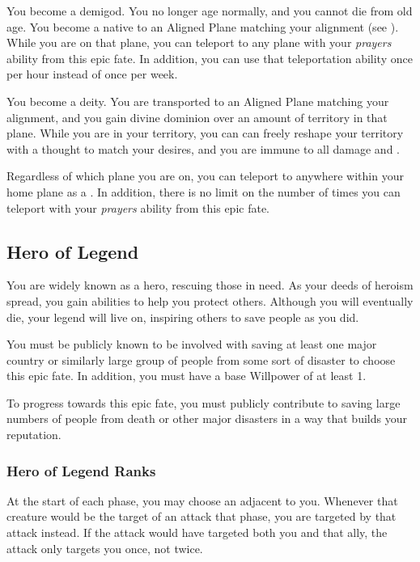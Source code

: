              You become a demigod.
            You no longer age normally, and you cannot die from old age.
            You become a  native to an Aligned Plane matching your alignment (see ).
            While you are on that plane, you can teleport to any plane with your \textit{prayers} ability from this epic fate.
            In addition, you can use that teleportation ability once per hour instead of once per week.

             You become a deity.
            You are transported to an Aligned Plane matching your alignment, and you gain divine dominion over an amount of territory in that plane.
            While you are in your territory, you can can freely reshape your territory with a thought to match your desires, and you are immune to all damage and .

            Regardless of which plane you are on, you can teleport to anywhere within your home plane as a .
            In addition, there is no limit on the number of times you can teleport with your \textit{prayers} ability from this epic fate.

    \subsection{Hero of Legend}
        You are widely known as a hero, rescuing those in need.
        As your deeds of heroism spread, you gain abilities to help you protect others.
        Although you will eventually die, your legend will live on, inspiring others to save people as you did.

         You must be publicly known to be involved with saving at least one major country or similarly large group of people from some sort of disaster to choose this epic fate.
        In addition, you must have a base Willpower of at least 1.

         To progress towards this epic fate, you must publicly contribute to saving large numbers of people from death or other major disasters in a way that builds your reputation.

        \subsubsection{Hero of Legend Ranks}
             At the start of each phase, you may choose an  adjacent to you.
            Whenever that creature would be the target of an attack that phase, you are targeted by that attack instead.
            If the attack would have targeted both you and that ally, the attack only targets you once, not twice.

